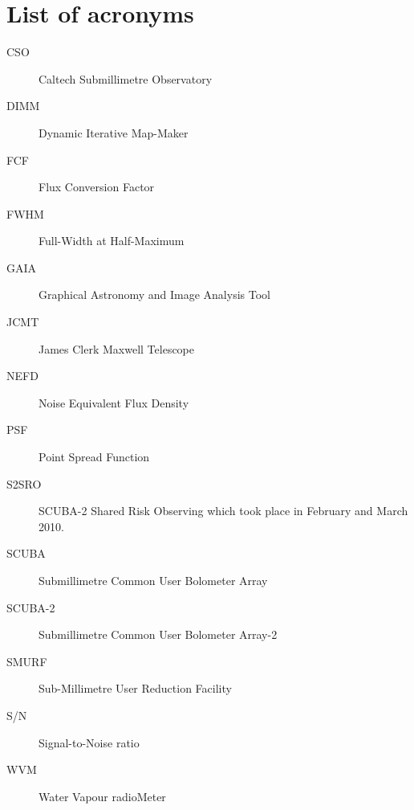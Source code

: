 \documentclass[twoside,11pt]{article}
\newcommand{\xlabel}[1]{}
\renewcommand{\_}{\texttt{\symbol{95}}}
\begin{document}
\section{\xlabel{acronyms}List of acronyms}

\begin{description}

\item[CSO]\quad Caltech Submillimetre Observatory

\item[DIMM]\quad Dynamic Iterative Map-Maker

\item[FCF]\quad Flux Conversion Factor

\item[FWHM]\quad Full-Width at Half-Maximum

\item[GAIA]\quad Graphical Astronomy and Image Analysis Tool

\item[JCMT]\quad James Clerk Maxwell Telescope

\item[NEFD]\quad Noise Equivalent Flux Density

\item[PSF]\quad Point Spread Function

\item[S2SRO]\quad SCUBA-2 Shared Risk Observing which took place in
  February and March 2010.

\item[SCUBA]\quad Submillimetre Common User Bolometer Array

\item[SCUBA-2]\quad Submillimetre Common User Bolometer Array-2

\item[SMURF]\quad Sub-Millimetre User Reduction Facility

\item[S/N]\quad Signal-to-Noise ratio

\item[WVM]\quad Water Vapour radioMeter


\end{description}
\end{document}

